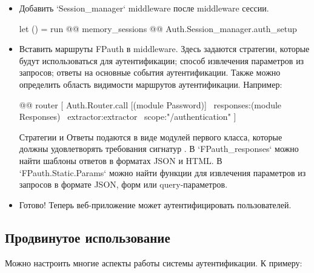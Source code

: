 \begin{itemize}\item{Добавить `Session\_manager` middleware после middleware сессии.\medbreak
\begin{ocamlcodeblock}
let () = run
  @@ memory_sessions
  @@ Auth.Session_manager.auth_setup
\end{ocamlcodeblock}\medbreak
}\end{itemize}%
\begin{itemize}\item{Вставить маршруты FPauth в  middleware. Здесь задаются стратегии, которые будут использоваться для аутентификации; способ извлечения параметров из запросов; ответы на основные события аутентификации. Также можно определить область видимости маршрутов аутентификации. Например: \medbreak
\begin{ocamlcodeblock}
@@ router [
    Auth.Router.call [(module Password)] ~responses:(module Responses) ~extractor:extractor ~scope:"/authentication"
]
\end{ocamlcodeblock}\medbreak
Стратегии и Ответы подаются в виде модулей первого класса, которые должны удовлетворять требования сигнатур \hyperref[page-FPauth-core-module-FPauth+u+core-module-Auth+u+sign-module-type-STRATEGY]{}. В `FPauth\_responses` можно найти шаблоны ответов в форматах JSON и HTML. В `FPauth.Static.Params` можно найти функции для извлечения параметров из запросов в формате JSON, форм или query-параметров.

}\end{itemize}%
\begin{itemize}\item{Готово! Теперь веб-приложение может аутентифицировать пользователей.}\end{itemize}%
\subsection{Продвинутое использование\label{Продвинутое-использование}}%
Можно настроить многие аспекты работы системы аутентификации. К примеру:

